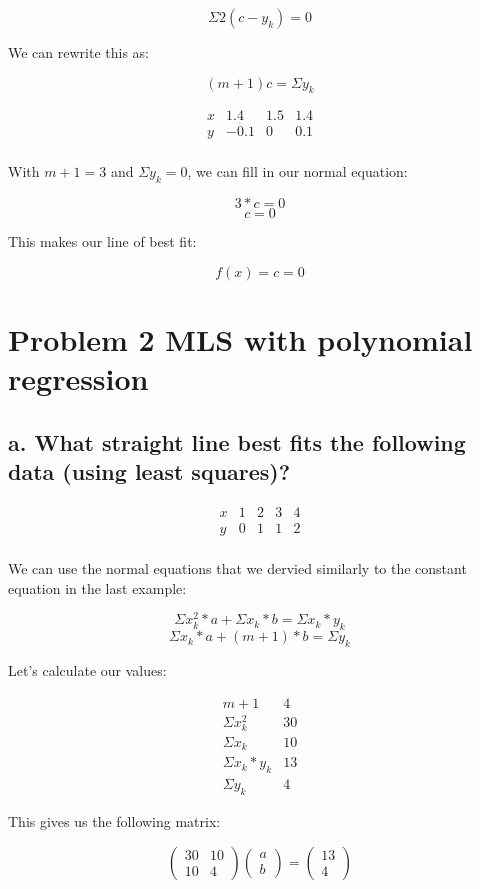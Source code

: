 \documentclass[]{article}
\begin{document}
\[\Sigma2(c - y_k)=0\]

We can rewrite this as:

\[(m+1)c = \Sigma y_k\]

\[
\begin{array}{c|c|c|c|} 
x & 1.4 & 1.5 & 1.4\\
y & -0.1 & 0 & 0.1\\
\end{array}
\]

With \(m+1 = 3\) and \(\Sigma y_k = 0\), we can fill in our normal
equation:

\[3*c = 0\] \[c = 0\]

This makes our line of best fit:

\[f(x) = c = 0\]

\section{Problem 2 MLS with polynomial
regression}\label{problem-2-mls-with-polynomial-regression}

\subsection{a. What straight line best fits the following data (using
least
squares)?}\label{a.-what-straight-line-best-fits-the-following-data-using-least-squares}

\[
\begin{array}{c|c|c|c|c|} 
x & 1 & 2 & 3 & 4\\
y & 0 & 1 & 1 & 2\\
\end{array}
\]

We can use the normal equations that we dervied similarly to the
constant equation in the last example:

\[\Sigma x_k^2*a + \Sigma x_k * b = \Sigma x_k * y_k\]
\[\Sigma x_k * a + (m + 1)*b = \Sigma y_k\]

Let's calculate our values:

\[
\begin{array}{c|c|} 
m+1 & 4\\
\Sigma x_k^2 & 30\\
\Sigma x_k & 10\\
\Sigma x_k*y_k & 13\\
\Sigma y_k & 4
\end{array}
\]

This gives us the following matrix:

\[
\left(\begin{array}{cc} 
30 & 10\\
10 & 4
\end{array}\right)
\left(\begin{array}{c} 
a \\
b 
\end{array}\right) =
\left(\begin{array}{c}
13 \\
4 
\end{array}\right)
\]
\end{document}
